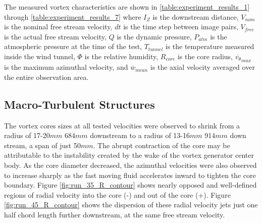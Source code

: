 

The measured vortex characteristics are shown in 
\ref{table:experiment_results_1} through \ref{table:experiment_results_7} where 
$I_Z$ is the downstream distance, 
$V_{nom}$ is the nominal free stream velocity, $dt$ is the time step between 
image pairs, $V_{free}$ is the actual free stream velocity, $Q$ is the dynamic 
pressure, $P_{atm}$ is the atmospheric pressure at the time of the test, 
$T_{tunnel}$ is the temperature measured inside the wind tunnel, $\Phi$ is the 
relative humidity, $R_{core}$ is the core radius, $\overline{v_{\theta}}_{max}$ 
is the maximum azimuthal velocity, and $\overline{w}_{mean}$ is the axial 
velocity averaged over the entire observation area.









\subsection{Macro-Turbulent Structures}
\label{section:macroturb}

The vortex cores sizes at all tested velocities were observed to shrink from 
a radius of 17-20$mm$ 684$mm$ downstream to a radius of 13-16$mm$ 914$mm$ down 
stream, a span of just 50$mm$. The abrupt contraction of the core 
may be attributable to the instability created by the wake of the vortex 
generator center body. As the core diameter decreased, the azimuthal velocities 
were also observed to increase sharply as the fast moving fluid accelerates 
inward to tighten the core boundary. Figure \ref{fig:run_35_R_contour} shows 
nearly opposed and well-defined regions of radial velocity into the core (-) 
and out of the core (+). Figure \ref{fig:run_45_R_contour} shows the dispersion 
of these radial velocity jets just one half chord length further downstream, at 
the same free stream velocity. 




